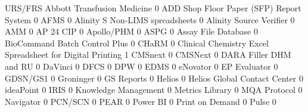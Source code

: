 \documentclass{article}
\begin{document}
\begin{Schunk}
\begin{Soutput}
                                                            URS/FRS
  Abbott Transfusion Medicine                                     0
  ADD Shop Floor Paper (SFP) Report System                        0
  AFMS                                                            0
  Alinity S Non-LIMS spreadsheets                                 0
  Alinity Source Verifier                                         0
  AMM                                                             0
  AP 24 CIP                                                       0
  Apollo/PHM                                                      0
  ASPG                                                            0
  Assay File Database                                             0
  BioCommand Batch Control Plus                                   0
  CHaRM                                                           0
  Clinical Chemistry Excel Spreadsheet for Digital Printing       1
  CMSnext                                                         0
  CMSNext                                                         0
  DARA Filler DHM and RU                                          0
  DaVinci                                                         0
  DFCS                                                            0
  DPW                                                             0
  EDMS                                                            0
  eNovator                                                        0
  EP Evaluator                                                    0
  GDSN/GS1                                                        0
  Groninger                                                       0
  GS Reports                                                      0
  Helios                                                          0
  Helios Global Contact Center                                    0
  ideaPoint                                                       0
  IRIS                                                            0
  Knowledge Management                                            0
  Metrics Library                                                 0
  MQA Protocol                                                    0
  Navigator                                                       0
  PCN/SCN                                                         0
  PEAR                                                            0
  Power BI                                                        0
  Print on Demand                                                 0
  Pulse                                                           0

\end{Soutput}
\end{Schunk}
\end{document}
